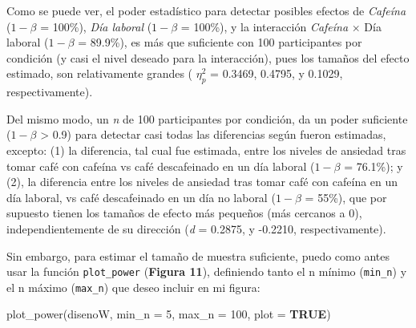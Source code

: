 \documentclass[
]{article}
\newenvironment{Shaded}{\begin{snugshade}}{\end{snugshade}}
\newcommand{\AttributeTok}[1]{\textcolor[rgb]{0.16,0.50,0.73}{#1}}
\newcommand{\ConstantTok}[1]{\textcolor[rgb]{0.15,0.68,0.68}{\textbf{#1}}}
\newcommand{\DecValTok}[1]{\textcolor[rgb]{0.96,0.45,0.00}{#1}}
\newcommand{\FunctionTok}[1]{\textcolor[rgb]{0.56,0.27,0.68}{#1}}
\newcommand{\NormalTok}[1]{\textcolor[rgb]{0.81,0.81,0.76}{#1}}
\begin{document}
Como se puede ver, el poder estadístico para detectar posibles efectos
de \emph{Cafeína} (\(1-\beta\) = 100\%), \emph{Día laboral} (\(1-\beta\)
= 100\%), y la interacción \emph{Cafeína} \(\times\) Día laboral
(\(1-\beta\) = 89.9\%), es más que suficiente con 100 participantes por
condición (y casi el nivel deseado para la interacción), pues los
tamaños del efecto estimado, son relativamente grandes ( \(\eta_p^2\) =
0.3469, 0.4795, y 0.1029, respectivamente).

Del mismo modo, un \emph{n} de 100 participantes por condición, da un
poder suficiente (\(1-\beta\) \textgreater{} 0.9) para detectar casi
todas las diferencias según fueron estimadas, excepto: (1) la
diferencia, tal cual fue estimada, entre los niveles de ansiedad tras
tomar café con cafeína vs café descafeinado en un día laboral
(\(1-\beta\) = 76.1\%); y (2), la diferencia entre los niveles de
ansiedad tras tomar café con cafeína en un día laboral, vs café
descafeinado en un día no laboral (\(1-\beta\) = 55\%), que por supuesto
tienen los tamaños de efecto más pequeños (más cercanos a 0),
independientemente de su dirección (\emph{d} = 0.2875, y -0.2210,
respectivamente).

Sin embargo, para estimar el tamaño de muestra suficiente, puedo como
antes usar la función \texttt{plot\_power} (\textbf{Figura 11}),
definiendo tanto el n mínimo (\texttt{min\_n}) y el n máximo
(\texttt{max\_n}) que deseo incluir en mi figura:

\begin{Shaded}
\begin{Highlighting}[]
\FunctionTok{plot\_power}\NormalTok{(disenoW, }
           \AttributeTok{min\_n =} \DecValTok{5}\NormalTok{, }
           \AttributeTok{max\_n =} \DecValTok{100}\NormalTok{, }
           \AttributeTok{plot =} \ConstantTok{TRUE}\NormalTok{)}
\end{Highlighting}
\end{Shaded}
\end{document}
